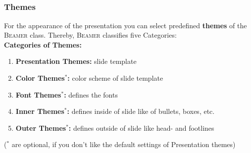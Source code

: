 \documentclass[[newPxFont]{beamer}
\begin{document}
\subsection{}
\begin{frame}[fragile]
  \frametitle{Themes}
  \begin{small}
  For the appearance of the presentation you can select predefined \textbf{themes}
of the {\scshape Beamer} class. Thereby, {\scshape Beamer }classifies five Categories:\\
\vspace{0.67cm}
\textbf{Categories of Themes:}
\begin{enumerate}
  \item \textbf{\color{green}Presentation Themes:} slide template
  \item \textbf{\color{green} Color Themes$^*$:} color scheme of slide template
  \item \textbf{\color{green} \color{green} Font Themes$^*$:} defines the fonts
  \item \textbf{\color{green} Inner Themes$^*$:} defines inside of slide like of bullets, boxes, etc.
  \item \textbf{\color{green} Outer Themes$^*$:} defines outside of slide like head- and footlines
\end{enumerate}
($^*$ are optional, if you don’t like the default settings of Presentation themes)
  \end{small}
\end{frame}
\end{document}
